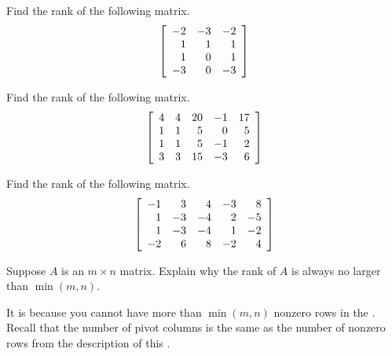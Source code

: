\begin{enumialphparenastyle}
\begin{ex} Find the rank of the following matrix.
\begin{equation*}
\left[
\begin{array}{rrr}
-2 & -3 & -2 \\
1 & 1 & 1 \\
1 & 0 & 1 \\
-3 & 0 & -3
\end{array}
\right]
\end{equation*}
\end{ex}

\begin{ex} Find the rank of the following matrix.
\begin{equation*}
\left[
\begin{array}{rrrrr}
4 & 4 & 20 & -1 & 17 \\
1 & 1 & 5 & 0 & 5 \\
1 & 1 & 5 & -1 & 2 \\
3 & 3 & 15 & -3 & 6
\end{array}
\right]
\end{equation*}
\end{ex}

\begin{ex} Find the rank of the following matrix.
\begin{equation*}
\left[
\begin{array}{rrrrr}
-1 & 3 & 4 & -3 & 8 \\
1 & -3 & -4 & 2 & -5 \\
1 & -3 & -4 & 1 & -2 \\
-2 & 6 & 8 & -2 & 4
\end{array}
 \right]
\end{equation*}
\end{ex}

\begin{ex} Suppose $A$ is an $m\times n$ matrix. Explain why the rank of $A$ is
always no larger than $\min \left( m,n\right) .$
\begin{sol}
It is because you cannot
have more than $\min \left( m,n\right) $ nonzero rows in the \rref. Recall that the number of pivot columns is the same as the
number of nonzero rows from the description of this \rref.
\end{sol}
\end{ex}


\end{enumialphparenastyle}

